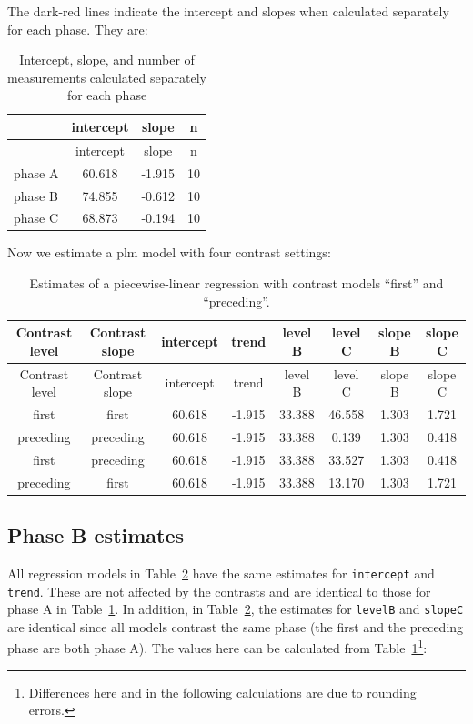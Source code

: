 \documentclass[
  letterpaper,
  DIV=11,
  numbers=noendperiod]{scrreprt}
\begin{document}
The dark-red lines indicate the intercept and slopes when calculated
separately for each phase. They are:

\hypertarget{tbl-contrasts-ex-2}{}
\begin{longtable}[]{@{}lccc@{}}
\caption{\label{tbl-contrasts-ex-2}Intercept, slope, and number of
measurements calculated separately for each phase}\tabularnewline
\toprule()
& intercept & slope & n \\
\midrule()
\endfirsthead
\toprule()
& intercept & slope & n \\
\midrule()
\endhead
phase A & 60.618 & -1.915 & 10 \\
phase B & 74.855 & -0.612 & 10 \\
phase C & 68.873 & -0.194 & 10 \\
\bottomrule()
\end{longtable}

Now we estimate a plm model with four contrast settings:

\hypertarget{tbl-contrast-first-preceding}{}
\begin{longtable}[]{@{}cccccccc@{}}
\caption{\label{tbl-contrast-first-preceding}Estimates of a
piecewise-linear regression with contrast models ``first'' and
``preceding''.}\tabularnewline
\toprule()
Contrast level & Contrast slope & intercept & trend & level B & level C
& slope B & slope C \\
\midrule()
\endfirsthead
\toprule()
Contrast level & Contrast slope & intercept & trend & level B & level C
& slope B & slope C \\
\midrule()
\endhead
first & first & 60.618 & -1.915 & 33.388 & 46.558 & 1.303 & 1.721 \\
preceding & preceding & 60.618 & -1.915 & 33.388 & 0.139 & 1.303 &
0.418 \\
first & preceding & 60.618 & -1.915 & 33.388 & 33.527 & 1.303 & 0.418 \\
preceding & first & 60.618 & -1.915 & 33.388 & 13.170 & 1.303 & 1.721 \\
\bottomrule()
\end{longtable}

\hypertarget{phase-b-estimates}{%
\subsection{Phase B estimates}\label{phase-b-estimates}}

All regression models in Table~\ref{tbl-contrast-first-preceding} have
the same estimates for \texttt{intercept} and \texttt{trend}. These are
not affected by the contrasts and are identical to those for phase A in
Table~\ref{tbl-contrasts-ex-2}. In addition, in
Table~\ref{tbl-contrast-first-preceding}, the estimates for
\texttt{levelB} and \texttt{slopeC} are identical since all models
contrast the same phase (the first and the preceding phase are both
phase A). The values here can be calculated from
Table~\ref{tbl-contrasts-ex-2}\footnote{Differences here and in the
  following calculations are due to rounding errors.}:
\end{document}
